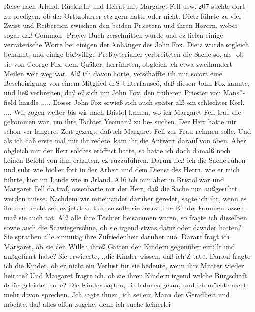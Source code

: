 Reise nach Jrland. Rückkehr und Heirat mit Margaret Fell usw. 207
suchte dort zu predigen, ob der Orttzpfarrer etz gern hatte oder
nicht. Dietz führte zu viel Zwist und Reibereien zwischen den
beiden Priestern und ihren Hörern, wobei sogar daß Common-
Prayer Buch zerschnitten wurde und ez fielen einige verräterische
Worte bei einigen der Anhänger des John Fox. Dietz wurde
sogleich bekannt, und einige bößwillige Preßbyterianer verbreiteten
die Sache so, als- ob sie von George Fox, dem Quäker, herrührten,
obgleich ich etwa zweihundert Meilen weit weg war. Alß ich
davon hörte, verschaffte ich mir sofort eine Bescheinigung von
einem Mitglied deS Unterhauseö, daß diesen John Fox kannte,
und ließ verbreiten, daß eß sich um John Fox, den früheren
Priester von Mans?-field handle ..... Dieser John Fox erwieß
sich auch später alß ein schlechter Kerl. ....
Wir zogen weiter bis wir nach Bristol kamen, wo ich Margaret
Fell traf, die gekommen war, um ihre Tochter Yeomanß zu be-
suchen. Der Herr hatte mir schon vor längerer Zeit gezeigt, daß
ich Margaret Fell zur Frau nehmen solle. Und als ich daß erste
mal mit ihr redete, kam ihr die Antwort darauf von oben. Aber
obgleich mir der Herr solches eröffnet hatte, so hatte ich doch
damalß noch keinen Befehl von ihm erhalten, ez auzzuführen.
Darum ließ ich die Sache ruhen und suhr wie biöher fort in der
Arbeit und dem Dienst des Herrn, wie er mich führte, hier im
Lande wie in Jrland. A16 ich nun aber in Bristol war und
Margaret Fell da traf, ossenbarte mir der Herr, daß die Sache
nun außgesührt werden müsse. Nachdem wir miteinander darüber
geredet, sagte ich ihr, wenn es ihr auch recht sei, ez jetzt zu tun,
so solle sie zuerst ihre Kinder kommen lassen, maß sie auch tat.
Alß alle ihre Töchter beisammen waren, so fragte ich dieselben
sowie auch die Schwiegersöhne, ob sie irgend etwas dafür oder
dawider hätten? Sie sprachen alle einmütig ihre Zufriedenheit
darüber auö. Darauf fragt ich Margaret, ob sie den Willen ihreß
Gatten den Kindern gegenüber erfüllt und außgeführt habe?
Sie erwiderte, .,die Kinder wissen, daß ich’Z tat«. Darauf fragte
ich die Kinder, ob ez nicht ein Verlust für sie bedeute, wenn
ihre Mutter wieder heirate? Und Margaret fragte ich, ob sie
ihren Kindern irgend welche Bürgschaft dafür geleistet habe?
Die Kinder sagten, sie habe es getan, und ich möchte nicht mehr
davon sprechen. Jch sagte ihnen, ich sei ein Mann der Geradheit
und möchte, daß alles offen zugehe, denn ich suche keinerlei


